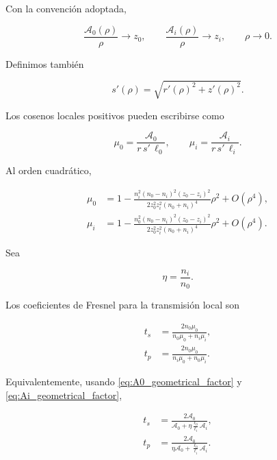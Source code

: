 Con la convención adoptada,

\begin{equation}
\frac{\mathcal A_0(\rho)}{\rho}
\longrightarrow
z_0,
\qquad
\frac{\mathcal A_i(\rho)}{\rho}
\longrightarrow
z_i,
\qquad
\rho\to0.
\label{eq:A0_Ai_axis_limits}
\end{equation}

Definimos también

\begin{equation}
s'(\rho)
=
\sqrt{r'(\rho)^2+z'(\rho)^2}.
\label{eq:sprime_definition}
\end{equation}

Los cosenos locales positivos pueden escribirse como

\begin{equation}
\mu_0
=
\frac{\mathcal A_0}{r\,s'\,\ell_0},
\qquad
\mu_i
=
\frac{\mathcal A_i}{r\,s'\,\ell_i}.
\label{eq:positive_direction_cosines}
\end{equation}

Al orden cuadrático,

\begin{align}
\mu_0
&=
1
-
\frac{
n_i^2(n_0-n_i)^2(z_0-z_i)^2
}{
2z_0^2z_i^2(n_0+n_i)^4
}
\rho^2
+
O(\rho^4),
\label{eq:mu0_series_second_order}
\\[6pt]
\mu_i
&=
1
-
\frac{
n_0^2(n_0-n_i)^2(z_0-z_i)^2
}{
2z_0^2z_i^2(n_0+n_i)^4
}
\rho^2
+
O(\rho^4).
\label{eq:mui_series_second_order}
\end{align}

Sea

\begin{equation}
\eta=\frac{n_i}{n_0}.
\label{eq:eta_definition}
\end{equation}

Los coeficientes de Fresnel para la transmisión local son

\begin{align}
t_s
&=
\frac{
2n_0\mu_0
}{
n_0\mu_0+n_i\mu_i
},
\label{eq:fresnel_ts_cosine_form}
\\[6pt]
t_p
&=
\frac{
2n_0\mu_0
}{
n_i\mu_0+n_0\mu_i
}.
\label{eq:fresnel_tp_cosine_form}
\end{align}

Equivalentemente, usando \eqref{eq:A0_geometrical_factor} y \eqref{eq:Ai_geometrical_factor},

\begin{align}
t_s
&=
\frac{
2\mathcal A_0
}{
\mathcal A_0
+
\eta
\frac{\ell_0}{\ell_i}
\mathcal A_i
},
\label{eq:fresnel_ts_exact}
\\[8pt]
t_p
&=
\frac{
2\mathcal A_0
}{
\eta\mathcal A_0
+
\frac{\ell_0}{\ell_i}
\mathcal A_i
}.
\label{eq:fresnel_tp_exact}
\end{align}

